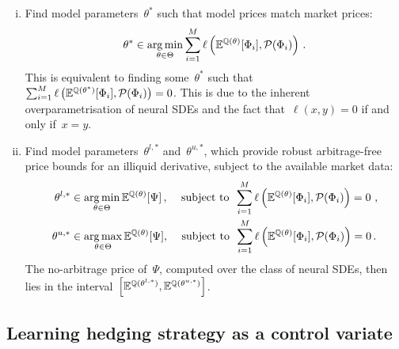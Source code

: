 \begin{enumerate}[i)]
\item Find model parameters~$\theta^*$ such that model prices match market prices:
\begin{equation}\label{eq LSV loss}
\theta^{\ast} \in \operatorname*{arg\,min}_{\theta \in \Theta}\sum_{i=1}^M \ell\left(\mathbb{E}^{\mathbb{Q}(\theta)}[\Phi_i],\mathcal{P}(\Phi_i) \right)\,.
\end{equation}
This is equivalent to finding some~$\theta^*$ such that~$\sum_{i=1}^M \ell\left(\mathbb{E}^{\mathbb{Q}(\theta^*)}[\Phi_i],\mathcal{P}(\Phi_i) \right) = 0$. This is due to the inherent overparametrisation of neural SDEs and the fact that~$\ell(x,y) = 0$ if and only if~$x=y$.
\item Find model parameters~$\theta^{l,*}$ and~$\theta^{u,*}$, which provide robust arbitrage-free price bounds for an illiquid derivative, subject to the available market data: 
\begin{equation}\label{eq LSV loss lb}
\begin{split}
	 \theta^{l,\ast} & \in  \operatorname*{arg\,min}_{\theta \in \Theta} \mathbb{E}^{\mathbb{Q}(\theta)}[\Psi]\,,\,\,\,~\text{ subject to}\,\,\, \sum_{i=1}^M \ell\left(\mathbb{E}^{\mathbb{Q}(\theta)}[\Phi_i], \mathcal{P}(\Phi_i)\right) = 0\,\,, \\
	  \theta^{u,\ast} & \in  \operatorname*{arg\,max}_{\theta \in \Theta} \mathbb{E}^{\mathbb{Q}(\theta)}[\Psi],\,\,\,~\text{ subject to}\,\,\, \sum_{i=1}^M \ell\left(\mathbb{E}^{\mathbb{Q}(\theta)}[\Phi_i], \mathcal{P}(\Phi_i)\right) = 0\,. 
\end{split}	
\end{equation}
The no-arbitrage price of~$\Psi$, computed over the class of neural SDEs, then lies in the interval~$\Big[\mathbb{E}^{\mathbb{Q}(\theta^{l,*})}, \mathbb{E}^{\mathbb{Q}(\theta^{u,*})}\Big]$.
\end{enumerate}


\subsection{Learning hedging strategy as a control variate}
\label{sec learning hedging strategy}

